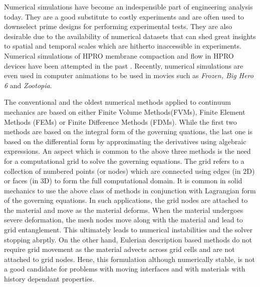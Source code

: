 Numerical simulations have become an indespensible part of engineering analysis today. They are a good substitute to costly experiments and are often used to downselect prime designs for performing experimental tests. They are also desirable due to the availability of numerical datasets that can shed great insights to spatial and temporal scales which are hitherto inaccessible in experiments. Numerical simulations of HPRO membrane compaction and flow in HPRO devices have been attempted in the past \cite{Gu2017,Pankaj2016,Abdelbaky2019,Liang2019,Lelong2019,Mao2021,Benjamin2022,Aschmoneit2022}. Recently, numerical simulations are even used in computer animations to be used in movies such as \textit{Frozen, Big Hero 6} and \textit{Zootopia}.
 
The conventional and the oldest numerical methods applied to continuum mechanics are based on either Finite Volume Methods(FVMs), Finite Element Methods (FEMs) or Finite Difference Methods (FDMs). While the first two methods are based on the integral form of the governing quations, the last one is based on the differential form by approximating the derivatives using algebraic expressions. An aspect which is common to the above three methods is the need for a computational grid to solve the governing equations. The grid refers to a collection of numbered points (or nodes) which are connected using edges (in 2D) or faces (in 3D) to form the full computational domain. It is common in solid mechanics to use the above class of methods in conjunction with Lagrangian form of the governing equations. In such applications, the grid nodes are attached to the material and move as the material deforms. When the material undergoes severe deformation, the mesh nodes move along with the material and lead to grid entanglement. This ultimately leads to numerical instabilities and the solver stopping abrptly. On the other hand, Eulerian description based methods do not require grid movement as the material advects across grid cells and are not attached to grid nodes. Hene, this formulation although numerically stable, is not a good candidate for problems with moving interfaces and with materials with history dependant properties. 


